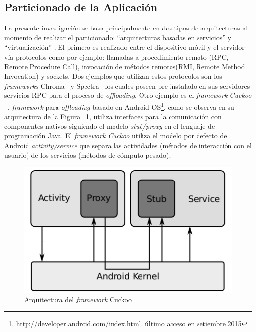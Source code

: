  \subsection{Particionado de la Aplicación}
 La presente investigación se basa principalmente en dos tipos de arquitecturas al momento de realizar el particionado:
 ``arquitecturas basadas en servicios'' y ``virtualización'' \cite{fernando2013mobile}.
 El primero es realizado entre el dispositivo móvil y el servidor vía protocolos como por ejemplo: llamadas a procedimiento remoto 
 (RPC, Remote Procedure Call), invocación de métodos remotos(RMI, Remote Method Invocation) y sockets.
 Dos ejemplos que utilizan estos protocolos son los \emph{frameworks} Chroma~\cite{balan2003tactics} y Spectra~\cite{flinn2002balancing}
 los cuales poseen pre-instalado en sus servidores servicios RPC para el proceso de \emph{offloading}. Otro ejemplo es el {\em framework 
 Cuckoo} ~\cite{kemp2012cuckoo}, \textit{framework} para
 \emph{offloading}  basado en Android OS\footnote{\url{http://developer.android.com/index.html}, último acceso en setiembre 2015}, como se observa en su arquitectura de la Figura ~\ref{fig:cuckoo}, utiliza interfaces
 para la comunicación con componentes
 nativos siguiendo el modelo {\em stub/proxy} en el lenguaje de programación Java. El {\em framework Cuckoo} utiliza el modelo por defecto 
 de Android {\em activity/service} que separa las actividades (métodos de interacción con el usuario) de los servicios
 (métodos de cómputo pesado).
 
\begin{figure}
\centering
  \includegraphics[scale=0.5]{Figures/cuckoo.png}
  \caption{Arquitectura del \emph{framework} Cuckoo \cite{kemp2012cuckoo}}
  \label{fig:cuckoo}
\end{figure}

